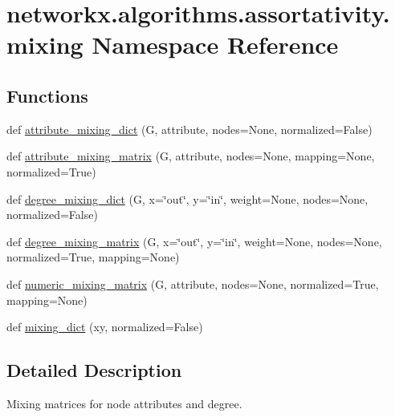\hypertarget{namespacenetworkx_1_1algorithms_1_1assortativity_1_1mixing}{}\section{networkx.\+algorithms.\+assortativity.\+mixing Namespace Reference}
\label{namespacenetworkx_1_1algorithms_1_1assortativity_1_1mixing}
\subsection*{Functions}
\begin{DoxyCompactItemize}
\item 
def \hyperlink{namespacenetworkx_1_1algorithms_1_1assortativity_1_1mixing_a531602d98d63ca449a3990b09e047922}{attribute\+\_\+mixing\+\_\+dict} (G, attribute, nodes=None, normalized=False)
\item 
def \hyperlink{namespacenetworkx_1_1algorithms_1_1assortativity_1_1mixing_a0fde3db1cb7c55c5e8a3481f39f37707}{attribute\+\_\+mixing\+\_\+matrix} (G, attribute, nodes=None, mapping=None, normalized=True)
\item 
def \hyperlink{namespacenetworkx_1_1algorithms_1_1assortativity_1_1mixing_a545380b81939bb93118f41649dbad940}{degree\+\_\+mixing\+\_\+dict} (G, x=\char`\"{}out\char`\"{}, y=\char`\"{}in\char`\"{}, weight=None, nodes=None, normalized=False)
\item 
def \hyperlink{namespacenetworkx_1_1algorithms_1_1assortativity_1_1mixing_ab3348dec618ed0e112ba5df0282a2141}{degree\+\_\+mixing\+\_\+matrix} (G, x=\char`\"{}out\char`\"{}, y=\char`\"{}in\char`\"{}, weight=None, nodes=None, normalized=True, mapping=None)
\item 
def \hyperlink{namespacenetworkx_1_1algorithms_1_1assortativity_1_1mixing_a4e2807a27a561a47ca20518500b85cf3}{numeric\+\_\+mixing\+\_\+matrix} (G, attribute, nodes=None, normalized=True, mapping=None)
\item 
def \hyperlink{namespacenetworkx_1_1algorithms_1_1assortativity_1_1mixing_ab7d7543a58b0404f8b8894ddc5966ace}{mixing\+\_\+dict} (xy, normalized=False)
\end{DoxyCompactItemize}


\subsection{Detailed Description}
\begin{DoxyVerb}Mixing matrices for node attributes and degree.
\end{DoxyVerb}
 


